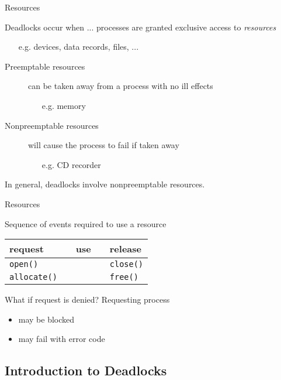 \begin{frame}{Resources}
  \begin{block}{Deadlocks occur when ...}
    processes are granted exclusive access to \emph{resources}
    \begin{itemize}
    \item[e.g.] devices, data records, files, ...
    \end{itemize}
  \end{block}
  \begin{description}
  \item[Preemptable resources] can be taken away from a process with no ill effects
    \begin{itemize}
    \item[e.g.] memory
    \end{itemize}
  \item[Nonpreemptable resources] will cause the process to fail if taken away
    \begin{itemize}
    \item[e.g.] CD recorder
    \end{itemize}
  \end{description}
  In general, deadlocks involve nonpreemptable resources.
\end{frame}

\begin{frame}{Resources}
  \begin{block}{Sequence of events required to use a resource}
    \begin{center}
      \begin{tabular}{lllll}
        request& \Symbol{➠}& use& \Symbol{➠}& release\\\hline
        \texttt{open()}&&&&\texttt{close()}\\
        \texttt{allocate()}&&&&\texttt{free()}
      \end{tabular}
    \end{center}
  \end{block}
  \begin{block}{What if request is denied?}
    Requesting process
    \begin{itemize}
    \item may be blocked
    \item may fail with error code
    \end{itemize}
  \end{block}
\end{frame}

\subsection{Introduction to Deadlocks}
\label{sec:intr-deadl}

